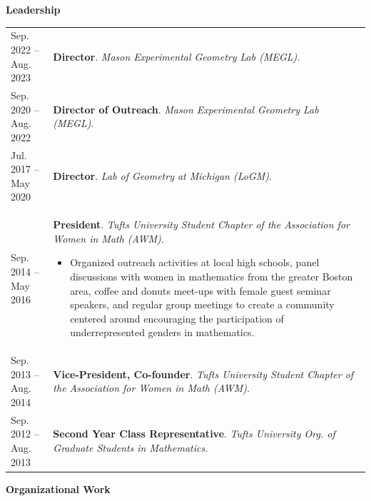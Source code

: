 
    \medskip


    \medskip
    \medskip



    \textbf{\large Leadership}
    
    \begin{center}
    {
    \renewcommand{\arraystretch}{1.2}
    \begin{longtable}{p{}  p{}}
     Sep.  2022 --  Aug.  2023 & \textbf{Director}. \textit{Mason Experimental Geometry Lab (MEGL)}.  \\ 
 Sep.  2020 --  Aug.  2022 & \textbf{Director of Outreach}. \textit{Mason Experimental Geometry Lab (MEGL)}.  \\ 
 Jul.  2017 --  May  2020 & \textbf{Director}. \textit{Lab of Geometry at Michigan (LoGM)}.  \\ 
 Sep.  2014 --  May  2016 & \textbf{President}. \textit{Tufts University Student Chapter of the Association for Women in Math (AWM)}. 
        \hspace{-1em}

        {\small
        \begin{itemize}
        \setlength{\parindent}{0em}
        \item[] Organized outreach activities at local high schools, panel discussions with women in mathematics from the greater Boston area, coffee and donuts meet-ups with female guest seminar speakers, and regular group meetings to create a community centered around encouraging the participation of underrepresented genders in mathematics.
        \end{itemize}
        }
        \vspace{-1em}
         \\ 
 Sep.  2013 --  Aug.  2014 & \textbf{Vice-President, Co-founder}. \textit{Tufts University Student Chapter of the Association for Women in Math (AWM)}.  \\ 
 Sep.  2012 --  Aug.  2013 & \textbf{Second Year Class Representative}. \textit{Tufts University Org. of Graduate Students in Mathematics}.  
    \end{longtable}
    } 
    \end{center}

    \vspace{-1em}
    

    \textbf{\large Organizational Work}
    
